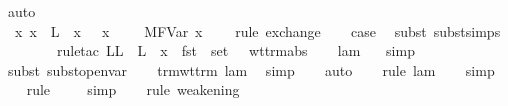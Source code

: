 \begin{isabellebody}
\ auto\ \ \ \ \ \ \ \ \ \ \ \ \ \ \ \ \ \ \ \ \ \ \ \ \ \ \ \ \ \ \ \ \ \ \ \ \ \ \ \ \ \ \ \ \ \ \ \ \ \ \ \ \ \ \ \ \ \isanewline
\ \ \isamarkupfalse%
\ {}{\isacharparenleft}{}{\isacharparenright}\ \isamarkupfalse%
\ {}{\isacharcolon}\ {\isachardoublequoteopen}{\isasymAnd}x{\isacharprime}{\isachardot}\ x{\isacharprime}\ {\isasymnotin}\ L{\isacharprime}\ {\isasymLongrightarrow}\ {\isacharparenleft}x{\isacharcomma}\ {\isasymtau}{\isacharparenright}\ {\isacharhash}\ {\isacharparenleft}x{\isacharprime}{\isacharcomma}\ {\isasympi}{\isacharparenright}\ {\isacharhash}\ {\isasymGamma}\ {\isasymturnstile}\ M{\isacharcircum}FVar\ x{\isacharprime}\ {\isacharcolon}\ {\isasymdelta}{\isachardoublequoteclose}\ \isamarkupfalse%
\ {\isacharparenleft}rule\ exchange{\isacharparenright}\isanewline
\isanewline
\ \ \isamarkupfalse%
\ {\isacharquery}case\ \isamarkupfalse%
\ {\isacharparenleft}subst\ subst{\isachardot}simps{\isacharparenright}\isanewline
\ \ \isamarkupfalse%
\ {}{\isacharparenleft}{}{\isacharparenright}\isanewline
\ \ \isamarkupfalse%
\ {\isacharparenleft}rule{\isacharunderscore}tac\ L{\isacharequal}{\isachardoublequoteopen}L\ {\isasymunion}\ L{\isacharprime}\ {\isasymunion}\ {\isacharbraceleft}x{\isacharbraceright}\ {\isasymunion}\ fst\ {\isacharbackquote}\ set\ {\isasymGamma}{\isachardoublequoteclose}\ \ wt{\isacharunderscore}trm{\isachardot}abs{\isacharparenright}\isanewline
\ \ \isamarkupfalse%
\ lam\ {}\ \isamarkupfalse%
\ simp\isanewline
\ \ \isamarkupfalse%
\ {\isacharparenleft}subst\ subst{\isacharunderscore}open{\isacharunderscore}var{}{\isacharparenright}\isanewline
\ \ \isamarkupfalse%
\ trm{\isacharunderscore}wt{\isacharunderscore}trm\ lam\ \isamarkupfalse%
\ simp\isanewline
\ \ \isamarkupfalse%
\ auto{\isacharbrackleft}{}{\isacharbrackright}\isanewline
\ \ \isamarkupfalse%
\ {\isacharparenleft}rule\ lam{\isacharparenleft}{}{\isacharparenright}{\isacharparenright}\isanewline
\ \ \isamarkupfalse%
\ simp\isanewline
\ \ \isamarkupfalse%
\ {\isacharparenleft}rule\ {}{\isacharparenright}\isanewline
\ \ \isamarkupfalse%
\ simp\isanewline
\ \ \isamarkupfalse%
\ {\isacharparenleft}rule\ weakening{\isacharparenright}\isanewline

\end{isabellebody}
